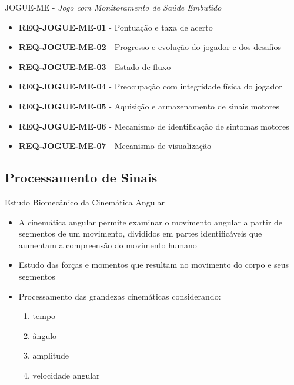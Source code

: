 \documentclass{beamer}
\begin{document}
\begin{frame}{JOGUE-ME - \textit{Jogo com Monitoramento de Saúde Embutido}}
	\begin{block}{}
		\begin{itemize}
			\item	\textbf{REQ-JOGUE-ME-01} - Pontuação e taxa de acerto
			\item	\textbf{REQ-JOGUE-ME-02} - Progresso e evolução do jogador e dos desafios
			\item	\textbf{REQ-JOGUE-ME-03} - Estado de fluxo
			\item	\textbf{REQ-JOGUE-ME-04} - Preocupação com integridade física do jogador
			\item	\textbf{REQ-JOGUE-ME-05} - Aquisição e armazenamento de sinais motores
			\item	\textbf{REQ-JOGUE-ME-06} - Mecanismo de identificação de sintomas motores
			\item	\textbf{REQ-JOGUE-ME-07} - Mecanismo de visualização
		\end{itemize}
	\end{block}
\end{frame}

\subsection{Processamento de Sinais}


\begin{frame}{Estudo Biomecânico da Cinemática Angular}
  \begin{block}{}
      \begin{itemize}
	 \item A cinemática angular permite examinar o movimento angular a partir de segmentos de um movimento, divididos em partes identificáveis que aumentam a compreensão do movimento humano  
	 \item Estudo das forças e momentos que resultam no movimento do corpo e seus segmentos
	 \item Processamento das grandezas cinemáticas considerando: 
	    \begin{enumerate}
	      \item tempo
	      \item ângulo
	      \item amplitude
	      \item velocidade angular
	    \end{enumerate}
       \end{itemize}
  \end{block}
\end{frame}
\end{document}
